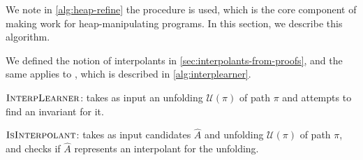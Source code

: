 We note in \autoref{alg:heap-refine} the procedure \seplearner is used, which is the core component of making \impact work for heap-manipulating programs. In this section, we describe this algorithm.

We defined the notion of interpolants in \autoref{sec:interpolants-from-proofs}, and the same applies to \seplearner, which is described in \autoref{alg:interplearner}.

\begin{algorithm}[ht]


  \caption{$\textsc{InterpLearner}$: takes as input an unfolding $\mathcal{U}(\pi)$ of path $\pi$ and attempts to find an invariant for it.}
  \label{alg:interplearner}
\end{algorithm}

\begin{algorithm}[ht]


  \caption{$\textsc{IsInterpolant}$: takes as input candidates $\hat{A}$ and unfolding $\mathcal{U}(\pi)$ of path $\pi$, and checks if $\hat{A}$ represents an interpolant for the unfolding.}
  \label{alg:isinterpolant}
\end{algorithm}

